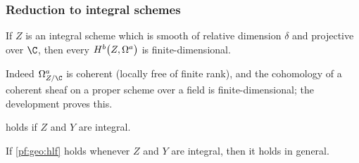 \subsubsection{Reduction to integral schemes}

\begin{littheorem}\label{pf:geo:lit:fin}
If $Z$ is an integral scheme which is smooth of relative dimension $\delta$ and projective over $\C$, then every $\geoHdg{Z}{a}{b}$ is
finite-dimensional.
\end{littheorem}

Indeed $\Omega^a_{Z/\C}$ is coherent (locally free of finite rank), and the cohomology of a coherent sheaf on a proper scheme over a
field is finite-dimensional; the development proves this.

\begin{proposition}\label{pf:geo:hlfint}
 holds if $Z$ and $Y$ are integral.
\end{proposition}

\begin{proposition}[Reduction]\label{pf:geo:hlfred}
If \cref{pf:geo:hlf} holds whenever $Z$ and $Y$ are integral, then it holds in general.
\end{proposition}

